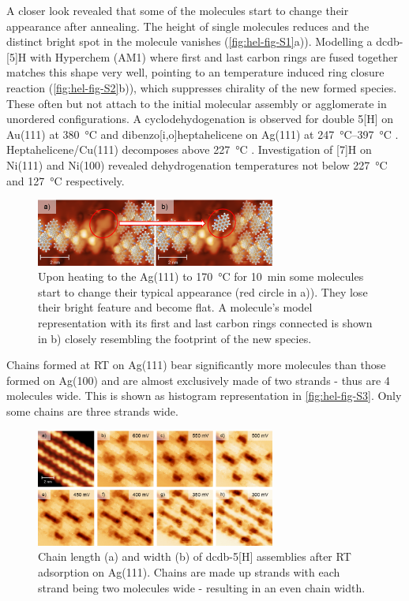 A closer look revealed that some of the molecules start to change their appearance after annealing.  The height of single molecules reduces and the distinct bright spot in the molecule vanishes (\autoref{fig:hel-fig-S1}a)). Modelling a dcdb-[5]H with Hyperchem (AM1) where first and last carbon rings are fused together matches this shape very well, pointing to an temperature induced ring closure reaction (\autoref{fig:hel-fig-S2}b)), which suppresses chirality of the new formed species. These often but not attach to the initial molecular assembly or agglomerate in unordered configurations. A cyclodehydogenation is observed for double 5[H] on Au(111) at \SI{380}{\celsius} \cite{Wang_Heteroatom-doped_2017} and dibenzo[i,o]heptahelicene on Ag(111) at \SIrange{247}{397}{\celsius} \cite{Stetsovych_helical_2016}. Heptahelicene/Cu(111) decomposes above \SI{227}{\celsius} \cite{Ernst_two-dimensional_2001}. Investigation of [7]H on Ni(111) and Ni(100) revealed dehydrogenation temperatures not below \SI{227}{\celsius} and \SI{127}{\celsius} respectively.\cite{Ernst_Adsorption_2003}

\begin{figure} \centering
	\includegraphics[width=0.7\textwidth]{./images/paper/helicene/fig-S2}
	\caption{Upon heating to the Ag(111) to \SI{170}{\celsius} for \SI{10}{\minute} some molecules start to change their typical appearance (red circle in a)). They lose their bright feature and become flat. A molecule’s model representation with its first and last carbon rings connected is shown in b) closely resembling the footprint of the new species.}
	\label{fig:hel-fig-S2}
\end{figure}

Chains formed at RT on Ag(111) bear significantly more molecules than those formed on Ag(100) and are almost exclusively made of two strands - thus are 4 molecules wide. This is shown as histogram representation in \autoref{fig:hel-fig-S3}. Only some chains are three strands wide.

\begin{figure} \centering
	\includegraphics[width=0.7\textwidth]{./images/paper/helicene/fig-S3}
	\caption{Chain length (a) and width (b) of dcdb-5[H] assemblies after RT adsorption on Ag(111). Chains are made up strands with each strand being two molecules wide - resulting in an even chain width.}
	\label{fig:hel-fig-S3}
\end{figure}
